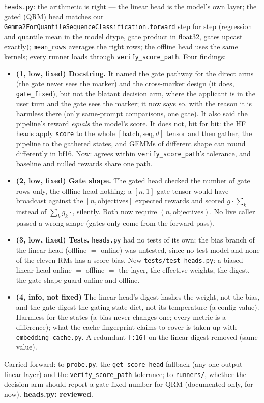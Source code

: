 \documentclass{article}
\begin{document}
\texttt{heads.py}: the arithmetic is right --- the linear head is the model's own layer; the gated (QRM) head
matches our \texttt{Gemma2ForQuantileSequenceClassification.forward} step for step (regression and quantile mean in
the model dtype, gate product in float32, gates upcast exactly); \texttt{mean\_rows} averages the right rows; the
offline head uses the same kernels; every runner loads through \texttt{verify\_score\_path}. Four findings:
\begin{itemize}
  \item \textbf{(1, low, fixed) Docstring.} It named the gate pathway for the direct arms (the gate never sees the
        marker) and the cross-marker design (it does, \texttt{gate\_fixed}), but not the blatant decision arm, where
        the applicant is in the user turn and the gate sees the marker; it now says so, with the reason it is
        harmless there (only same-prompt comparisons, one gate). It also said the pipeline's reward
        \emph{equals} the model's score. It does not, bit for bit: the HF heads apply \texttt{score} to the whole
        $[\mathrm{batch},\mathrm{seq},d]$ tensor and then gather, the pipeline to the gathered states, and GEMMs of
        different shape can round differently in bf16. Now: agrees within \texttt{verify\_score\_path}'s tolerance,
        and baseline and nulled rewards share one path.
  \item \textbf{(2, low, fixed) Gate shape.} The gated head checked the number of gate rows only, the offline
        head nothing; a $[n,1]$ gate tensor would have broadcast against the $[n,\text{objectives}]$ expected
        rewards and scored $g\cdot\sum_k$ instead of $\sum_k g_k\cdot$, silently. Both now require
        $(n,\text{objectives})$. No live caller passed a wrong shape (gates only come from the forward pass).
  \item \textbf{(3, low, fixed) Tests.} \texttt{heads.py} had no tests of its own; the bias branch of the linear
        head (offline $=$ online) was untested, since no test model and none of the eleven RMs has a score bias.
        New \texttt{tests/test\_heads.py}: a biased linear head online $=$ offline $=$ the layer, the effective
        weights, the digest, the gate-shape guard online and offline.
  \item \textbf{(4, info, not fixed)} The linear head's digest hashes the weight, not the bias, and the gate
        digest the gating state dict, not its temperature (a config value). Harmless for the states (a bias
        never changes one; every metric is a difference); what the cache fingerprint claims to cover is taken up
        with \texttt{embedding\_cache.py}. A redundant \texttt{[:16]} on the linear digest removed (same value).
\end{itemize}
Carried forward: to \texttt{probe.py}, the \texttt{get\_score\_head} fallback (any one-output linear layer) and the
\texttt{verify\_score\_path} tolerance; to \texttt{runners/}, whether the decision arm should report a
gate-fixed number for QRM (documented only, for now).
\textbf{heads.py: reviewed}.
\end{document}
